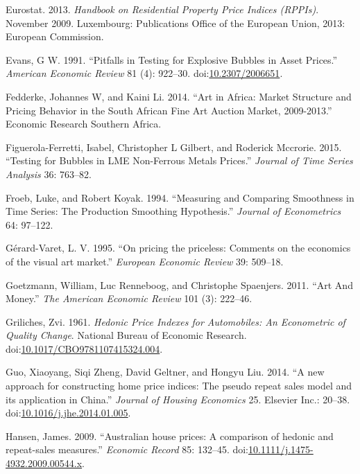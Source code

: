 \documentclass[]{elsarticle} %
\begin{document}
\hypertarget{ref-Eurostat2013}{}
Eurostat. 2013. \emph{Handbook on Residential Property Price Indices
(RPPIs)}. November 2009. Luxembourg: Publications Office of the European
Union, 2013: European Commission.

\hypertarget{ref-Evans1991}{}
Evans, G W. 1991. ``Pitfalls in Testing for Explosive Bubbles in Asset
Prices.'' \emph{American Economic Review} 81 (4): 922--30.
doi:\href{https://doi.org/10.2307/2006651}{10.2307/2006651}.

\hypertarget{ref-Fedderke2014}{}
Fedderke, Johannes W, and Kaini Li. 2014. ``Art in Africa: Market
Structure and Pricing Behavior in the South African Fine Art Auction
Market, 2009-2013.'' Economic Research Southern Africa.

\hypertarget{ref-Figuerola2015}{}
Figuerola-Ferretti, Isabel, Christopher L Gilbert, and Roderick
Mccrorie. 2015. ``Testing for Bubbles in LME Non-Ferrous Metals
Prices.'' \emph{Journal of Time Series Analysis} 36: 763--82.

\hypertarget{ref-Froeb1994}{}
Froeb, Luke, and Robert Koyak. 1994. ``Measuring and Comparing
Smoothness in Time Series: The Production Smoothing Hypothesis.''
\emph{Journal of Econometrics} 64: 97--122.

\hypertarget{ref-Gerard-Varet1995}{}
Gérard-Varet, L. V. 1995. ``On pricing the priceless: Comments on the
economics of the visual art market.'' \emph{European Economic Review}
39: 509--18.

\hypertarget{ref-Goetzmann2011}{}
Goetzmann, William, Luc Renneboog, and Christophe Spaenjers. 2011. ``Art
And Money.'' \emph{The American Economic Review} 101 (3): 222--46.

\hypertarget{ref-Griliches1961}{}
Griliches, Zvi. 1961. \emph{Hedonic Price Indexes for Automobiles: An
Econometric of Quality Change}. National Bureau of Economic Research.
doi:\href{https://doi.org/10.1017/CBO9781107415324.004}{10.1017/CBO9781107415324.004}.

\hypertarget{ref-Guo2014}{}
Guo, Xiaoyang, Siqi Zheng, David Geltner, and Hongyu Liu. 2014. ``A new
approach for constructing home price indices: The pseudo repeat sales
model and its application in China.'' \emph{Journal of Housing
Economics} 25. Elsevier Inc.: 20--38.
doi:\href{https://doi.org/10.1016/j.jhe.2014.01.005}{10.1016/j.jhe.2014.01.005}.

\hypertarget{ref-Hansen2009}{}
Hansen, James. 2009. ``Australian house prices: A comparison of hedonic
and repeat-sales measures.'' \emph{Economic Record} 85: 132--45.
doi:\href{https://doi.org/10.1111/j.1475-4932.2009.00544.x}{10.1111/j.1475-4932.2009.00544.x}.
\end{document}
